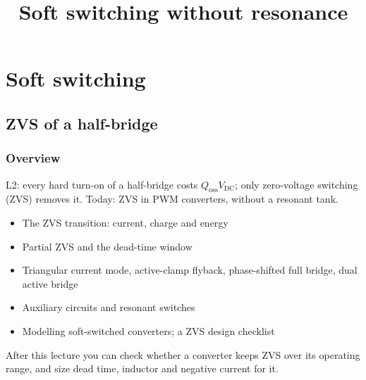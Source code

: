 \title[Soft switching]{Soft switching without resonance}
\section{Soft switching}

\begin{frame}[plain]
	\titlepage
\end{frame}

\subsection{ZVS of a half-bridge}

\begin{frame}
	\frametitle{Overview}
	L2: every hard turn-on of a half-bridge costs $Q_\mathrm{oss}V_\mathrm{DC}$; only zero-voltage switching (ZVS) removes it. Today: ZVS in PWM converters, without a resonant tank.
	\begin{itemize}
		\item The ZVS transition: current, charge and energy
		\item Partial ZVS and the dead-time window
		\item Triangular current mode, active-clamp flyback, phase-shifted full bridge, dual active bridge
		\item Auxiliary circuits and resonant switches
		\item Modelling soft-switched converters; a ZVS design checklist
	\end{itemize}
	After this lecture you can check whether a converter keeps ZVS over its operating range, and size dead time, inductor and negative current for it.
\end{frame}

